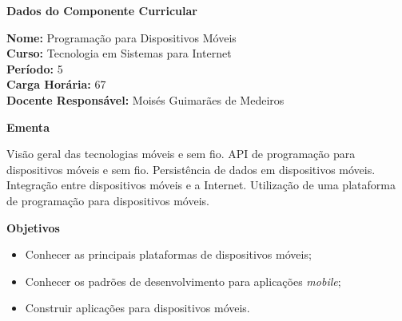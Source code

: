

\begin{snugshade}\begin{center}\textbf{
    Dados do Componente Curricular
}\end{center}\end{snugshade}

\noindent \textbf{Nome:}                Programação para Dispositivos Móveis
\\        \textbf{Curso:}               Tecnologia em Sistemas para Internet
\\        \textbf{Período:}             \unit{5}{\degree}
\\        \textbf{Carga Horária:}       \unit{67}{\hour}
\\        \textbf{Docente Responsável:} Moisés Guimarães de Medeiros


\begin{snugshade}\begin{center}\textbf{
    Ementa
\vphantom{q}}\end{center}\end{snugshade}

\noindent
Visão geral das tecnologias móveis e sem fio. API de programação para dispositivos móveis e sem fio. Persistência de dados em dispositivos móveis. Integração entre dispositivos móveis e a Internet. Utilização de uma plataforma de programação para dispositivos móveis.


\begin{snugshade}\begin{center}\textbf{
    Objetivos
}\end{center}\end{snugshade}

\begin{itemize}

\item Conhecer as principais plataformas de dispositivos móveis;

\item Conhecer os padrões de desenvolvimento para aplicações \textit{mobile};

\item Construir aplicações para dispositivos móveis.

\end{itemize}


